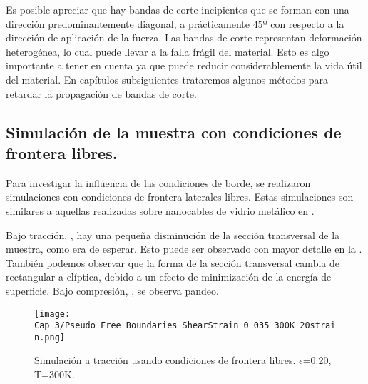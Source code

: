 Es posible apreciar que hay bandas de corte incipientes que se forman con una dirección predominantemente diagonal, a prácticamente $45º$ con respecto a la dirección de aplicación de la fuerza. Las bandas de corte representan deformación heterogénea, lo cual puede llevar a la falla frágil del material. Esto es algo importante a tener en cuenta ya que puede reducir considerablemente la vida útil del material. En capítulos subsiguientes trataremos algunos métodos para retardar la propagación de bandas de corte.

\subsection{Simulación de la muestra con condiciones de frontera libres.}
\label{S3_3_2}

Para investigar la influencia de las condiciones de borde, se realizaron simulaciones con condiciones de frontera laterales libres. Estas simulaciones son similares a aquellas realizadas sobre nanocables de vidrio metálico en \cite{xiao12}.

Bajo tracción, , hay una pequeña disminución de la sección transversal de la muestra, como era de esperar. Esto puede ser observado con mayor detalle en la . También podemos observar que la forma de la sección transversal cambia de rectangular a elíptica, debido a un efecto de minimización de la energía de superficie. Bajo compresión, , se observa pandeo.


\begin{figure}[htp]
\centering
\texttt{[image: Cap\_3/Pseudo\_Free\_Boundaries\_ShearStrain\_0\_035\_300K\_20strain.png]}
\caption[Simulación a tracción usando condiciones de frontera libres]{Simulación a tracción usando condiciones de frontera libres. $\epsilon$=0.20, T=300K.}
\label{C3:fg:libresTen}
\end{figure}

